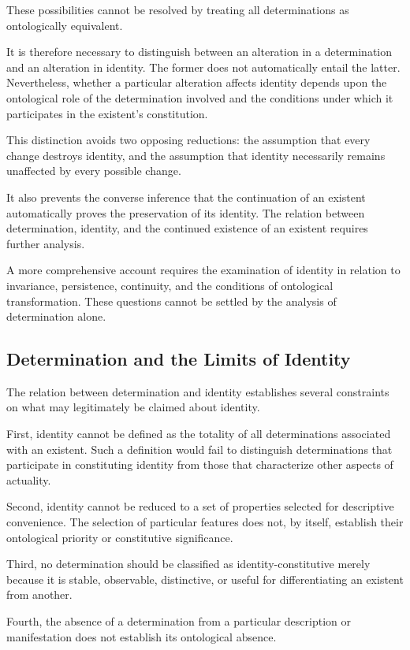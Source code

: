 These possibilities cannot be resolved by treating all
determinations as ontologically equivalent.

It is therefore necessary to distinguish between an
alteration in a determination and an alteration in
identity. The former does not automatically entail
the latter. Nevertheless, whether a particular alteration
affects identity depends upon the ontological role of
the determination involved and the conditions under
which it participates in the existent's constitution.

This distinction avoids two opposing reductions:
the assumption that every change destroys identity,
and the assumption that identity necessarily remains
unaffected by every possible change.

It also prevents the converse inference that the
continuation of an existent automatically proves the
preservation of its identity. The relation between
determination, identity, and the continued existence
of an existent requires further analysis.

A more comprehensive account requires the examination
of identity in relation to invariance, persistence,
continuity, and the conditions of ontological transformation.
These questions cannot be settled by the analysis of
determination alone.

\subsection{Determination and the Limits of Identity}

The relation between determination and identity establishes
several constraints on what may legitimately be claimed
about identity.

First, identity cannot be defined as the totality of all
determinations associated with an existent. Such a definition
would fail to distinguish determinations that participate
in constituting identity from those that characterize
other aspects of actuality.

Second, identity cannot be reduced to a set of properties
selected for descriptive convenience. The selection of
particular features does not, by itself, establish their
ontological priority or constitutive significance.

Third, no determination should be classified as
identity-constitutive merely because it is stable,
observable, distinctive, or useful for differentiating
an existent from another.

Fourth, the absence of a determination from a particular
description or manifestation does not establish its
ontological absence.

